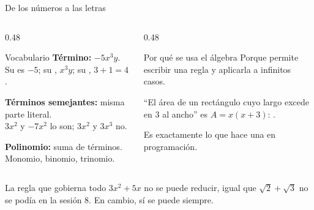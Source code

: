 \documentclass[aspectratio=169,10pt]{beamer}
\begin{document}
\begin{frame}{De los números a las letras}
  \scriptsize
  \begin{columns}[T,onlytextwidth]
    \begin{column}{0.48\textwidth}
      \begin{block}{Vocabulario}
        \tiny
        \textbf{Término:} $-5x^{3}y$. Su  es $-5$; su
        , $x^{3}y$; su , $3+1=4$.

        \vspace{0.06cm}
        \textbf{Términos semejantes:} misma parte literal. \\
        $3x^{2}$ y $-7x^{2}$ lo son; $3x^{2}$ y $3x^{3}$ no.

        \vspace{0.06cm}
        \textbf{Polinomio:} suma de términos. Monomio, binomio, trinomio.
      \end{block}
    \end{column}
    \begin{column}{0.48\textwidth}
      \begin{alertblock}{Por qué se usa el álgebra}
        \tiny
        Porque permite escribir una regla  y aplicarla a
        infinitos casos.

        \vspace{0.06cm}
        ``El área de un rectángulo cuyo largo excede en 3 al ancho'' es
        $A = x(x+3)$: .

        \vspace{0.06cm}
        Es exactamente lo que hace una  en programación.
      \end{alertblock}
    \end{column}
  \end{columns}

  \vspace{0.1cm}
  \begin{exampleblock}{La regla que gobierna todo}
    \scriptsize
     $3x^{2} + 5x$ no se puede
    reducir, igual que $\sqrt2 + \sqrt3$ no se podía en la sesión 8. En
    cambio,  sí se puede siempre.
  \end{exampleblock}
\end{frame}

\end{document}
